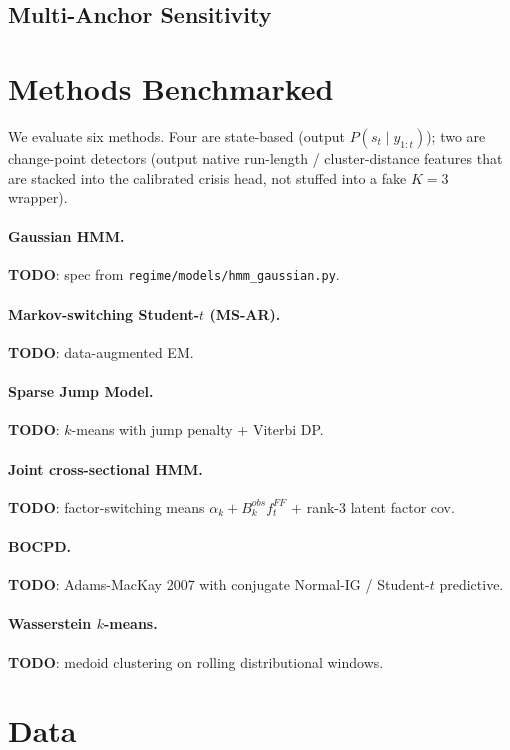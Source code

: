 \documentclass[11pt]{article}
\begin{document}
\subsection{Multi-Anchor Sensitivity}
\label{sec:protocol-anchors}

\section{Methods Benchmarked}
\label{sec:methods}

We evaluate six methods. Four are state-based (output $P(s_t \mid y_{1:t})$);
two are change-point detectors (output native run-length / cluster-distance
features that are stacked into the calibrated crisis head, not stuffed into
a fake $K{=}3$ wrapper).

\paragraph{Gaussian HMM.} \textbf{TODO}: spec from \texttt{regime/models/hmm\_gaussian.py}.
\paragraph{Markov-switching Student-$t$ (MS-AR).} \textbf{TODO}: data-augmented EM.
\paragraph{Sparse Jump Model.} \textbf{TODO}: $k$-means with jump penalty + Viterbi DP.
\paragraph{Joint cross-sectional HMM.} \textbf{TODO}: factor-switching means $\alpha_k + B_k^{obs} f_t^{FF}$
+ rank-3 latent factor cov.
\paragraph{BOCPD.} \textbf{TODO}: Adams-MacKay 2007 with conjugate Normal-IG / Student-$t$ predictive.
\paragraph{Wasserstein $k$-means.} \textbf{TODO}: medoid clustering on rolling distributional windows.

\section{Data}
\label{sec:data}
\end{document}
